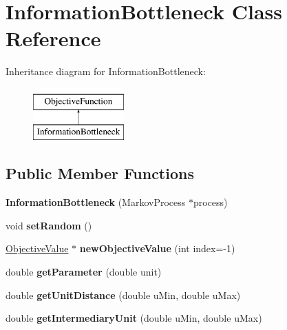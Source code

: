 \hypertarget{classInformationBottleneck}{\section{Information\-Bottleneck Class Reference}
\label{classInformationBottleneck}
}
Inheritance diagram for Information\-Bottleneck\-:\begin{figure}[H]
\begin{center}
\leavevmode
\includegraphics[height=2.000000cm]{classInformationBottleneck}
\end{center}
\end{figure}
\subsection*{Public Member Functions}
\begin{DoxyCompactItemize}
\item 
\hypertarget{classInformationBottleneck_aa2b0adc85665a04330d1356bf77097b6}{{\bfseries Information\-Bottleneck} (Markov\-Process $\ast$process)}\label{classInformationBottleneck_aa2b0adc85665a04330d1356bf77097b6}

\item 
\hypertarget{classInformationBottleneck_a10e4ace575f79977f3f6d2f39403dd84}{void {\bfseries set\-Random} ()}\label{classInformationBottleneck_a10e4ace575f79977f3f6d2f39403dd84}

\item 
\hypertarget{classInformationBottleneck_af710cb93d1be643a5f67c5d879669b8b}{\hyperlink{classObjectiveValue}{Objective\-Value} $\ast$ {\bfseries new\-Objective\-Value} (int index=-\/1)}\label{classInformationBottleneck_af710cb93d1be643a5f67c5d879669b8b}

\item 
\hypertarget{classInformationBottleneck_ab3ccf81c8633628cd1a4cc37de61a95b}{double {\bfseries get\-Parameter} (double unit)}\label{classInformationBottleneck_ab3ccf81c8633628cd1a4cc37de61a95b}

\item 
\hypertarget{classInformationBottleneck_a2b29527ef1700808f67ceb1b821a1626}{double {\bfseries get\-Unit\-Distance} (double u\-Min, double u\-Max)}\label{classInformationBottleneck_a2b29527ef1700808f67ceb1b821a1626}

\item 
\hypertarget{classInformationBottleneck_a8a7cc07d65482418e1d62b5f84ec2c45}{double {\bfseries get\-Intermediary\-Unit} (double u\-Min, double u\-Max)}\label{classInformationBottleneck_a8a7cc07d65482418e1d62b5f84ec2c45}

\end{DoxyCompactItemize}

